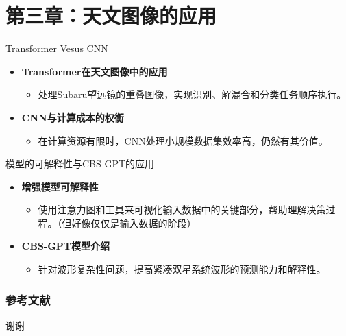 \documentclass[10pt]{ctexbeamer}
\begin{document}
\section{第三章：天文图像的应用}

\begin{frame}{Transformer Vesus CNN}
  \begin{itemize}
    \item \textbf{Transformer在天文图像中的应用}
          \begin{itemize}
            \item 处理Subaru望远镜的重叠图像，实现识别、解混合和分类任务顺序执行。
          \end{itemize}
    \item \textbf{CNN与计算成本的权衡}
          \begin{itemize}
            \item 在计算资源有限时，CNN处理小规模数据集效率高，仍然有其价值。
          \end{itemize}
  \end{itemize}
\end{frame}

\begin{frame}{模型的可解释性与CBS-GPT的应用}
  \begin{itemize}
    \item \textbf{增强模型可解释性}
          \begin{itemize}
            \item 使用注意力图和工具来可视化输入数据中的关键部分，帮助理解决策过程。（但好像仅仅是输入数据的阶段）
          \end{itemize}
    \item \textbf{CBS-GPT模型介绍}
          \begin{itemize}
            \item 针对波形复杂性问题，提高紧凑双星系统波形的预测能力和解释性。
          \end{itemize}
  \end{itemize}
\end{frame}




\begin{frame}
  \frametitle{参考文献}
  \nocite{*}%
  \printbibliography%
\end{frame}

\begin{frame}[plain]
  \vfill
  \centerline{\Huge 谢谢}
  \vfill
\end{frame}

%  
\end{document}
